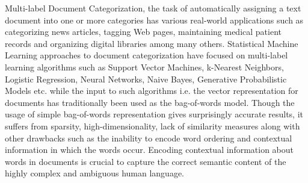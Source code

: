 Multi-label Document Categorization, the task of automatically assigning a text document into one or more categories has various real-world applications such as categorizing news articles, tagging Web pages, maintaining medical patient records and organizing digital libraries among many others. Statistical Machine Learning approaches to document categorization have focused on multi-label learning algorithms such as Support Vector Machines, k-Nearest Neighbors, Logistic Regression, Neural Networks, Naive Bayes, Generative Probabilistic Models etc. while the input to such algorithms i.e. the vector representation for documents has traditionally been used as the bag-of-words model. Though the usage of simple bag-of-words representation gives surprisingly accurate results, it suffers from sparsity, high-dimensionality, lack of similarity measures along with other drawbacks such as the inability to encode word ordering and contextual information in which the words occur. Encoding contextual information about words in documents is crucial to capture the correct semantic content of the highly complex and ambiguous human language.  \hfill \break

